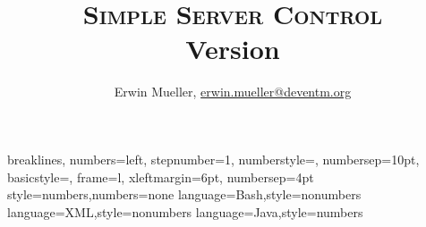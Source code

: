 \setlength{\parskip}{1ex plus 0.5ex minus 0.2ex}

\title{\textsc{Simple Server Control}
\\
\normalsize{Version \softwareversion}}

\author{Erwin Mueller, \url{erwin.mueller@deventm.org}}

\renewcommand{\versionshistory}{
  \begin{tabular*}{0.8\textwidth}{llp{3cm}p{4cm}}
  Version & Date & Author & Changes \\
  \toprule
  0.1 & 2011-09-04 & Erwin Müller & Erste Version der Zielbestimmungen. \\
  \end{tabular*}
}

\newcommand{\sscontrol}{\textit{Simple Server Control}}
\newcommand{\code}{\texttt}
\newcommand{\config}[1]{``\texttt{#1}''}
\newcommand{\parameter}[1]{``\texttt{#1}'' Parameter}
\newcommand{\directive}[1]{``\texttt{#1}'' Direktive}
\newcommand{\variable}[1]{``\texttt{#1}'' Variable}
\newcommand{\imgnumber}[1]{\texttt{\##1}}

\newcommand{\softwarename}{\textit{FDS Keys Command Line}}
\newcommand{\softwareversion}{0.8}

\newcommand{\refsection}[1]{Abschnitt \ref{#1}}
\newcommand{\reflisting}[1]{Listing \ref{#1}}
\newcommand{\refequation}[1]{Formel \ref{#1}}
\newcommand{\reftable}[1]{Tabelle \ref{#1}}


{breaklines, numbers=left, stepnumber=1, numberstyle=\tiny, numbersep=10pt, basicstyle=\scriptsize\ttfamily, frame=l, xleftmargin=6pt, numbersep=4pt}
{style=numbers,numbers=none}
{language=Bash,style=nonumbers}
{language=XML,style=nonumbers}
{language=Java,style=numbers}

\setlength{\columnseprule}{.1pt}
